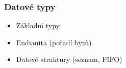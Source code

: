 
\begin{frame}
  \frametitle{Datové typy}


  \bigskip

  \begin{itemize}
  \item Základní typy
  \item Endianita (pořadí bytů)
  \item Datové struktury (seznam, FIFO)
  \end{itemize}

\end{frame}


